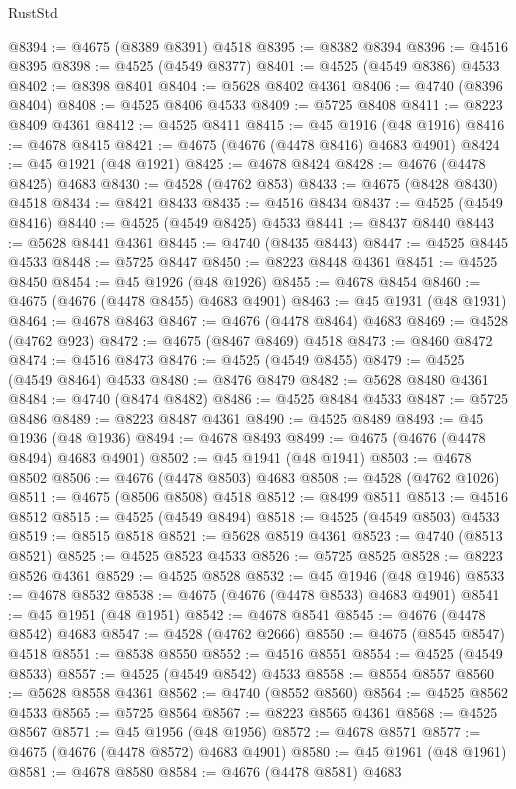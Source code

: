 \begin{lexlean}{RustStd}
\begin{coremodule}
@8394 := @4675 (@8389 @8391) @4518
@8395 := @8382 @8394
@8396 := @4516 @8395
@8398 := @4525 (@4549 @8377)
@8401 := @4525 (@4549 @8386) @4533
@8402 := @8398 @8401
@8404 := @5628 @8402 @4361
@8406 := @4740 (@8396 @8404)
@8408 := @4525 @8406 @4533
@8409 := @5725 @8408
@8411 := @8223 @8409 @4361
@8412 := @4525 @8411
@8415 := @45 @1916 (@48 @1916)
@8416 := @4678 @8415
@8421 := @4675 (@4676 (@4478 @8416) @4683 @4901)
@8424 := @45 @1921 (@48 @1921)
@8425 := @4678 @8424
@8428 := @4676 (@4478 @8425) @4683
@8430 := @4528 (@4762 @853)
@8433 := @4675 (@8428 @8430) @4518
@8434 := @8421 @8433
@8435 := @4516 @8434
@8437 := @4525 (@4549 @8416)
@8440 := @4525 (@4549 @8425) @4533
@8441 := @8437 @8440
@8443 := @5628 @8441 @4361
@8445 := @4740 (@8435 @8443)
@8447 := @4525 @8445 @4533
@8448 := @5725 @8447
@8450 := @8223 @8448 @4361
@8451 := @4525 @8450
@8454 := @45 @1926 (@48 @1926)
@8455 := @4678 @8454
@8460 := @4675 (@4676 (@4478 @8455) @4683 @4901)
@8463 := @45 @1931 (@48 @1931)
@8464 := @4678 @8463
@8467 := @4676 (@4478 @8464) @4683
@8469 := @4528 (@4762 @923)
@8472 := @4675 (@8467 @8469) @4518
@8473 := @8460 @8472
@8474 := @4516 @8473
@8476 := @4525 (@4549 @8455)
@8479 := @4525 (@4549 @8464) @4533
@8480 := @8476 @8479
@8482 := @5628 @8480 @4361
@8484 := @4740 (@8474 @8482)
@8486 := @4525 @8484 @4533
@8487 := @5725 @8486
@8489 := @8223 @8487 @4361
@8490 := @4525 @8489
@8493 := @45 @1936 (@48 @1936)
@8494 := @4678 @8493
@8499 := @4675 (@4676 (@4478 @8494) @4683 @4901)
@8502 := @45 @1941 (@48 @1941)
@8503 := @4678 @8502
@8506 := @4676 (@4478 @8503) @4683
@8508 := @4528 (@4762 @1026)
@8511 := @4675 (@8506 @8508) @4518
@8512 := @8499 @8511
@8513 := @4516 @8512
@8515 := @4525 (@4549 @8494)
@8518 := @4525 (@4549 @8503) @4533
@8519 := @8515 @8518
@8521 := @5628 @8519 @4361
@8523 := @4740 (@8513 @8521)
@8525 := @4525 @8523 @4533
@8526 := @5725 @8525
@8528 := @8223 @8526 @4361
@8529 := @4525 @8528
@8532 := @45 @1946 (@48 @1946)
@8533 := @4678 @8532
@8538 := @4675 (@4676 (@4478 @8533) @4683 @4901)
@8541 := @45 @1951 (@48 @1951)
@8542 := @4678 @8541
@8545 := @4676 (@4478 @8542) @4683
@8547 := @4528 (@4762 @2666)
@8550 := @4675 (@8545 @8547) @4518
@8551 := @8538 @8550
@8552 := @4516 @8551
@8554 := @4525 (@4549 @8533)
@8557 := @4525 (@4549 @8542) @4533
@8558 := @8554 @8557
@8560 := @5628 @8558 @4361
@8562 := @4740 (@8552 @8560)
@8564 := @4525 @8562 @4533
@8565 := @5725 @8564
@8567 := @8223 @8565 @4361
@8568 := @4525 @8567
@8571 := @45 @1956 (@48 @1956)
@8572 := @4678 @8571
@8577 := @4675 (@4676 (@4478 @8572) @4683 @4901)
@8580 := @45 @1961 (@48 @1961)
@8581 := @4678 @8580
@8584 := @4676 (@4478 @8581) @4683

\end{coremodule}
\end{lexlean}
